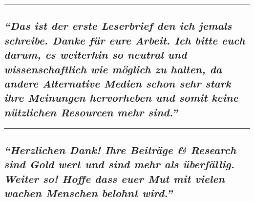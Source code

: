 \begin{center}\rule{0.5\linewidth}{\linethickness}\end{center}

\hypertarget{das-ist-der-erste-leserbrief-den-ich-jemals-schreibe-danke-fuxfcr-eure-arbeit-ich-bitte-euch-darum-es-weiterhin-so-neutral-und-wissenschaftlich-wie-muxf6glich-zu-halten-da-andere-alternative-medien-schon-sehr-stark-ihre-meinungen-hervorheben-und-somit-keine-nuxfctzlichen-resourcen-mehr-sind}{%
\subsection{\texorpdfstring{\emph{``Das ist der erste Leserbrief den ich
jemals schreibe. Danke für eure Arbeit. Ich bitte euch darum, es
weiterhin so neutral und wissenschaftlich wie möglich zu halten, da
andere Alternative Medien schon sehr stark ihre Meinungen hervorheben
und somit keine nützlichen Resourcen mehr
sind.''}}{``Das ist der erste Leserbrief den ich jemals schreibe. Danke für eure Arbeit. Ich bitte euch darum, es weiterhin so neutral und wissenschaftlich wie möglich zu halten, da andere Alternative Medien schon sehr stark ihre Meinungen hervorheben und somit keine nützlichen Resourcen mehr sind.''}}\label{das-ist-der-erste-leserbrief-den-ich-jemals-schreibe-danke-fuxfcr-eure-arbeit-ich-bitte-euch-darum-es-weiterhin-so-neutral-und-wissenschaftlich-wie-muxf6glich-zu-halten-da-andere-alternative-medien-schon-sehr-stark-ihre-meinungen-hervorheben-und-somit-keine-nuxfctzlichen-resourcen-mehr-sind}}

\begin{center}\rule{0.5\linewidth}{\linethickness}\end{center}

\hypertarget{herzlichen-dank-ihre-beitruxe4ge--research-sind-gold-wert-und-sind-mehr-als-uxfcberfuxe4llig-weiter-so-hoffe-dass-euer-mut-mit-vielen-wachen-menschen-belohnt-wird}{%
\subsection{\texorpdfstring{\emph{``Herzlichen Dank! Ihre Beiträge \&
Research sind Gold wert und sind mehr als überfällig. Weiter so! Hoffe
dass euer Mut mit vielen wachen Menschen belohnt
wird.''}}{``Herzlichen Dank! Ihre Beiträge \& Research sind Gold wert und sind mehr als überfällig. Weiter so! Hoffe dass euer Mut mit vielen wachen Menschen belohnt wird.''}}\label{herzlichen-dank-ihre-beitruxe4ge--research-sind-gold-wert-und-sind-mehr-als-uxfcberfuxe4llig-weiter-so-hoffe-dass-euer-mut-mit-vielen-wachen-menschen-belohnt-wird}}

